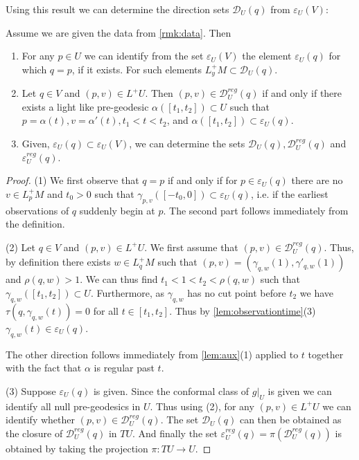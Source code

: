 Using this result we can determine the direction sets $\mathcal{D}_U(q)$ from $\varepsilon_U(V)$:
\begin{proposition}\label{prop:recoverD}Assume we are given the data from \ref{rmk:data}. Then
\begin{enumerate}[label={\textnormal{(\arabic*)}}]
    \item For any $p\in U$ we can identify from the set $\varepsilon_U(V)$ the element $\varepsilon_U(q)$ for which $q=p$, if it exists. For such elements $L^+_yM \subset \mathcal{D}_U(q)$.
    \item Let $q\in V$ and $(p,v) \in L^+U$. Then $(p,v) \in \mathcal{D}^{reg}_U(q)$ if and only if there exists a light like pre-geodesic $\alpha([t_1,t_2])\subset U$ such that $p=\alpha(t), v=\alpha'(t), t_1<t<t_2$, and $\alpha([t_1,t_2])\subset \varepsilon_U(q)$.
    \item Given, $\varepsilon_U(q)\subset\varepsilon_U(V)$, we can determine the sets $\mathcal{D}_U(q), \mathcal{D}^{reg}_U(q)$ and $\varepsilon^{reg}_U(q)$.
\end{enumerate}
\end{proposition}
\begin{proof}
(1) We first observe that $q=p$ if and only if for $p\in \varepsilon_U(q)$ there are no $v\in L^+_pM$ and $t_0>0$ such that $\gamma_{p,v}([-t_0,0])\subset\varepsilon_U(q)$, i.e. if the earliest observations of $q$ suddenly begin at $p$. The second part follows immediately from the definition.

(2) Let $q\in V$ and $(p,v)\in L^+U$. We first assume that $(p,v)\in\mathcal{D}^{reg}_U(q)$. Thus, by definition there exists $w\in L^+_qM$ such that $(p,v) = (\gamma_{q,w}(1), \gamma'_{q,w}(1))$ and $\rho(q,w)>1$. We can thus find $t_1<1<t_2<\rho(q,w)$ such that $\gamma_{q,w}([t_1,t_2])\subset U$. Furthermore, as $\gamma_{q,w}$ has no cut point before $t_2$ we have $\tau(q,\gamma_{q,w}(t)) = 0$ for all $t\in [t_1,t_2]$. Thus by \ref{lem:observationtime}(3) $\gamma_{q,w}(t)\in\varepsilon_U(q)$.

The other direction follows immediately from \ref{lem:aux}(1) applied to $t$ together with the fact that $\alpha$ is regular past $t$.

(3) Suppose $\varepsilon_U(q)$ is given. Since the conformal class of $g\rvert_U$ is given we can identify all null pre-geodesics in $U$. Thus using (2), for any $(p,v)\in L^+U$ we can identify whether $(p,v)\in \mathcal{D}^{reg}_U(q)$. The set $\mathcal{D}_U(q)$ can then be obtained as the closure of $\mathcal{D}^{reg}_U(q)$ in $TU$. And finally the set $\varepsilon^{reg}_U(q)=\pi(\mathcal{D}^{reg}_U(q))$ is obtained by taking the projection $\pi:TU\to U$.
\end{proof}

